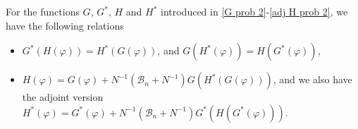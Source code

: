 \documentclass[reqno]{amsart}
\begin{document}
\begin{lemma}
\label{lem:aux relations} 
For the functions $G$, $G^{\ast }$, $H$ and $H^{\ast }$ introduced in 
\eqref{G prob 2}-\eqref{adj H prob 2}, we have the
following relations
\begin{itemize}
\item[(i)] $G^{\ast }(H(\varphi ))=H^{\ast }(G(\varphi ))$, and 
$G(H^{\ast }(\varphi ))=H(G^{\ast }(\varphi ))$,

\item[(ii)] $H(\varphi )=G(\varphi )+N^{-1}(\mathcal{B}_n+N^{-1})G(H^{\ast
}(G(\varphi )))$, and we also have the adjoint version $H^{\ast }(\varphi
)=G^{\ast }(\varphi )+N^{-1}(\mathcal{B}_n+N^{-1})G^{\ast }(H(G^{\ast
}(\varphi )))$.
\end{itemize}
\end{lemma}
\end{document}
